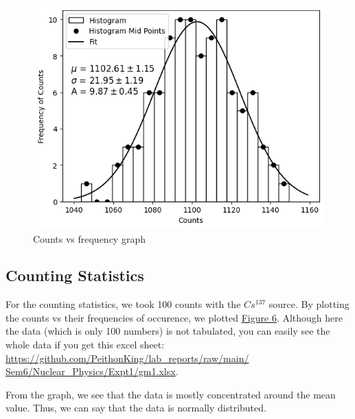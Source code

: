 		\begin{figure}[h]
			\centering
			\includegraphics[width=\columnwidth]{images/g4.png}
			\caption{Counts vs frequency graph}
			\label{graph:4}
		\end{figure}

	\subsection{Counting Statistics}

		For the counting statistics, we took 100 counts with the $Cs^{137}$ source. By plotting the counts vs their frequencies of occurence, we plotted \hyperref[graph:4]{Figure 6}. Although here the data (which is only 100 numbers) is not tabulated, you can easily see the whole data if you get this excel sheet: \href{https://github.com/PeithonKing/lab\_reports/raw/main/Sem6/Nuclear\_Physics/Expt1/gm1.xlsx}{https://github.com/PeithonKing/lab\_reports/raw/main/
		Sem6/Nuclear\_Physics/Expt1/gm1.xlsx}.
		
		From the graph, we see that the data is mostly concentrated around the mean value. Thus, we can say that the data is normally distributed.
